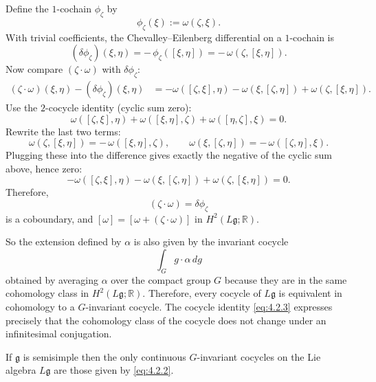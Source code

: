\documentclass[12pt]{article}
\begin{document}
\begin{remark}
    Define the $1$-cochain $\phi_\zeta$ by
    \[
        \phi_\zeta(\xi) := \omega(\zeta, \xi).
    \]
    With trivial coefficients, the Chevalley–Eilenberg differential on a $1$-cochain is
    \[
        (\delta\phi_\zeta)(\xi, \eta) = -\,\phi_\zeta([\xi, \eta]) = -\,\omega(\zeta, [\xi, \eta]).
    \]
    Now compare $(\zeta\cdot\omega)$ with $\delta\phi_\zeta$:
    \begin{align*}
        (\zeta\cdot\omega)(\xi, \eta) - (\delta\phi_\zeta)(\xi, \eta)
         & = -\omega([\zeta, \xi], \eta) - \omega(\xi, [\zeta, \eta]) + \omega(\zeta, [\xi, \eta]).
    \end{align*}
    Use the $2$-cocycle identity (cyclic sum zero):
    \[
        \omega([\zeta, \xi], \eta) + \omega([\xi, \eta], \zeta) + \omega([\eta, \zeta], \xi) = 0.
    \]
    Rewrite the last two terms:
    \[
        \omega(\zeta, [\xi, \eta]) = -\,\omega([\xi, \eta], \zeta), \qquad
        \omega(\xi, [\zeta, \eta]) = -\,\omega([\zeta, \eta], \xi).
    \]
    Plugging these into the difference gives exactly the negative of the cyclic sum above, hence zero:
    \[
        -\omega([\zeta, \xi], \eta) - \omega(\xi, [\zeta, \eta]) + \omega(\zeta, [\xi, \eta]) = 0.
    \]
    Therefore,
    \[
        (\zeta\cdot\omega) = \delta\phi_\zeta
    \]
    is a coboundary, and $[\omega] = [\omega + (\zeta\cdot\omega)]$ in $H^2(L\mathfrak{g};\mathbb{R})$.
\end{remark}

So the extension defined by $\alpha$ is also given by the invariant cocycle
\[
    \int_G g\cdot \alpha \, dg
\]
obtained by averaging $\alpha$ over the compact group $G$ because they are in the same cohomology class in $H^2(L\mathfrak{g};\mathbb{R})$. Therefore, every cocycle of $L\mathfrak{g}$ is equivalent in cohomology to a $G$-invariant cocycle. The cocycle identity \eqref{eq:4.2.3} expresses precisely that the cohomology class of the cocycle does not change under an infinitesimal conjugation.


\begin{proposition}\label{prop:invariant_cocycles}
    If $\mathfrak{g}$ is semisimple then the only continuous $G$-invariant
    cocycles on the Lie algebra $L\mathfrak{g}$ are those given by
    \eqref{eq:4.2.2}.
\end{proposition}
\end{document}
